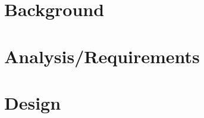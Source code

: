 \documentclass{l4proj}
\begin{document}


%
%
%
%

\chapter{Background}\label{ch:background}


\chapter{Analysis/Requirements}\label{ch:analysis/requirements}


\chapter{Design}\label{ch:design}

\end{document}
